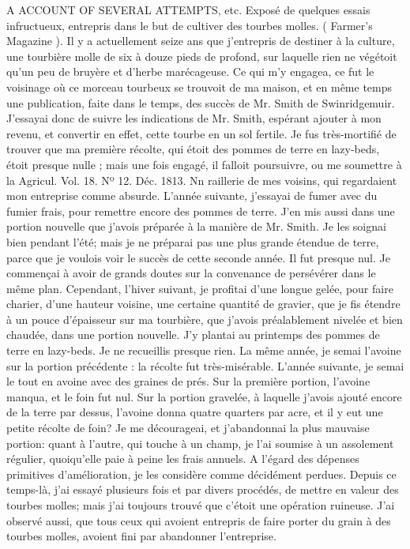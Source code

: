 \setcounter{page}{455} A ACCOUNT OF SEVERAL ATTEMPTS, etc. Exposé de quelques essais infructueux, entrepris dans le but de cultiver des tourbes molles. ( Farmer's Magazine ).
Il y a actuellement seize ans que j'entrepris de destiner à la culture, une tourbière molle de six à douze pieds de profond, sur laquelle rien ne végétoit qu'un peu de bruyère et d'herbe marécageuse. Ce qui m'y engagea, ce fut le voisinage où ce morceau tourbeux se trouvoit de ma maison, et en même temps une publication, faite dans le temps, des succès de Mr. Smith de Swinridgemuir. J'essayai donc de suivre les indications de Mr. Smith, espérant ajouter à mon revenu, et convertir en effet, cette tourbe en un sol fertile. Je fus très-mortifié de trouver que ma première récolte, qui étoit des pommes de terre en lazy-beds, étoit presque nulle ; mais une fois engagé, il falloit poursuivre, ou me soumettre à la Agricul. Vol. 18. Nº 12. Déc. 1813. Nn\setcounter{page}{456} raillerie de mes voisins, qui regardaient mon entreprise comme absurde.
L'année suivante, j'essayai de fumer avec du fumier frais, pour remettre encore des pommes de terre. J'en mis aussi dans une portion nouvelle que j'avois préparée à la manière de Mr. Smith. Je les soignai bien pendant l'été; mais je ne préparai pas une plus grande étendue de terre, parce que je voulois voir le succès de cette seconde année. Il fut presque nul. Je commençai à avoir de grands doutes sur la convenance de persévérer dans le même plan. Cependant, l'hiver suivant, je profitai d'une longue gelée, pour faire charier, d'une hauteur voisine, une certaine quantité de gravier, que je fis étendre à un pouce d'épaisseur sur ma tourbière, que j'avois préalablement nivelée et bien chaudée, dans une portion nouvelle. J'y plantai au printemps des pommes de terre en lazy-beds. Je ne recueillis presque rien. La même année, je semai l'avoine sur la portion précédente : la récolte fut très-misérable. L'année suivante, je semai le tout en avoine avec des graines de prés. Sur la première portion, l'avoine manqua, et le foin fut nul. Sur la portion gravelée, à laquelle j'avois ajouté encore de la terre par dessus, l'avoine donna quatre quarters par\setcounter{page}{457} acre, et il y eut une petite récolte de foin? Je me décourageai, et j'abandonnai la plus mauvaise portion: quant à l'autre, qui touche à un champ, je l'ai soumise à un assolement régulier, quoiqu'elle paie à peine les frais annuels. A l'égard des dépenses primitives d'amélioration, je les considère comme décidément perdues.
Depuis ce temps-là, j'ai essayé plusieurs fois et par divers procédés, de mettre en valeur des tourbes molles; mais j'ai toujours trouvé que c'étoit une opération ruineuse. J'ai observé aussi, que tous ceux qui avoient entrepris de faire porter du grain à des tourbes molles, avoient fini par abandonner l'entreprise.
